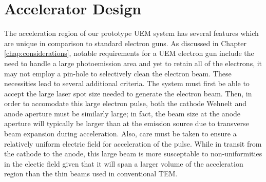 
\section{Accelerator Design} \label{sec:gun_design}

The acceleration region of our prototype UEM system has several features which are unique in comparison to standard electron guns.
As discussed in Chapter \ref{chap:considerations}, notable requirements for a UEM electron gun include the need to handle a large photoemission area and yet to retain all of the electrons, it may not employ a pin-hole to selectively clean the electron beam.
These necessities lead to several additional criteria.
The system must first be able to accept the large laser spot size needed to generate the electron beam.
Then, in order to accomodate this large electron pulse, both the cathode Wehnelt and anode aperture must be similarly large; in fact, the beam size at the anode aperture will typically be larger than at the emission source due to transverse beam expansion during acceleration.
Also, care must be taken to ensure a relatively uniform electric field for acceleration of the pulse.
While in transit from the cathode to the anode, this large beam is more susceptable to non-uniformities in the electic field given that it will span a larger volume of the acceleration region than the thin beams used in conventional TEM.

